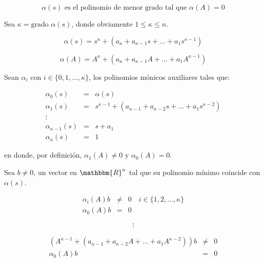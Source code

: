         \begin{equation}
            \alpha(s) \text{ es el polinomio de menor grado tal que } \alpha(A) = 0 \nonumber
        \end{equation}

        Sea $\kappa = \text{grado } \alpha(s)$, donde obviamente $1 \le \kappa \le n$.

        \begin{equation}
            \alpha(s) = s^{\kappa} + (a_{\kappa} + a_{\kappa - 1} s + \dots + a_1 s^{\kappa - 1}) \nonumber
        \end{equation}

        \begin{equation}
            \alpha(A) = A^{\kappa} + (a_{\kappa} + a_{\kappa - 1} A + \dots + a_1 A^{\kappa - 1}) \nonumber
        \end{equation}

        Sean $\alpha_i$ con $i \in \{ 0, 1, \dots, \kappa \}$, los polinomios mónicos auxiliares tales que:

        \begin{eqnarray}
        \alpha_0(s) & = & \alpha(s) \nonumber \\
        \alpha_1(s) & = & s^{\kappa - 1} + (a_{\kappa - 1} + a_{\kappa - 2} s + \dots + a_1 s^{\kappa - 2}) \nonumber \\
        \vdots \nonumber \\
        \alpha_{\kappa - 1}(s) & = & s + a_1 \nonumber \\
        \alpha_{\kappa}(s) & = & 1 \nonumber
        \end{eqnarray}

        en donde, por definición, $\alpha_1(A) \ne 0$ y $\alpha_0(A) = 0$.

        Sea $b \ne 0$, un vector en $\mathbbm{R}^n$ tal que su polinomio mínimo coincide con $\alpha(s)$.

        \begin{eqnarray}
        \alpha_i(A) b & \ne & 0 \quad i \in \{ 1, 2, \dots, \kappa \} \nonumber \\
        \alpha_0(A) b & = & 0 \nonumber
        \end{eqnarray}

        \begin{equation}
            \vdots \nonumber
        \end{equation}

        \begin{eqnarray}
        (A^{\kappa - 1} + (a_{\kappa - 1} + a_{\kappa - 2} A + \dots + a_1 A^{\kappa - 2})) b & \ne & 0 \nonumber \\
        \alpha_0(A) b & = & 0 \nonumber
        \end{eqnarray}

